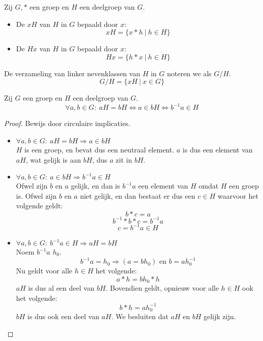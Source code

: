\documentclass[main.tex]{subfiles}
\begin{document}
\begin{de}
  \label{de:nevenklassen}
  Zij $G,*$ een groep en $H$ een deelgroep van $G$.
  \begin{itemize}
  \item De  $xH$ van $H$ in $G$ bepaald door $x$:
    \[ xH = \{ x * h\ |\ h \in H \} \]
  \item De  $Hx$ van $H$ in $G$ bepaald door $x$:
    \[ Hx = \{ h * x\ |\ h \in H \} \]
  \end{itemize}
  De verzameling van linker nevenklassen van $H$ in $G$ noteren we als $G/H$.
  \[ G/H = \{ xH\ |\ x \in G \} \]
\end{de}

\begin{ei}
  \label{ei:linker-nevenklasse-eig}
  Zij $G$ een groep en $H$ een deelgroep van $G$.
  \[ \forall a,b \in G:\ aH = bH \Leftrightarrow a \in bH \Leftrightarrow b^{-1}a \in H \]

  \begin{proof}
    Bewijs door circulaire implicaties.
    \begin{itemize}
    \item $\forall a,b \in G:\ aH = bH \Rightarrow a \in bH$\\
      $H$ is een groep, en bevat dus een neutraal element.
      $a$ is dus een element van $aH$, wat gelijk is aan $bH$, dus $a$ zit in $bH$.
    \item $\forall a,b \in G:\ a \in bH \Rightarrow b^{-1}a \in H$\\
      Ofwel zijn $b$ en $a$ gelijk, en dan is $b^{-1}a$ een element van $H$ omdat $H$ een groep is.
      Ofwel zijn $b$ en $a$ niet gelijk, en dan bestaat er dus een $c \in H$ waarvoor het volgende geldt:
      \[ b*c = a\]
      \[ b^{-1}*b*c = b^{-1}a\]
      \[ c = b^{-1}a \in H \]
    \item $\forall a,b \in G:\ b^{-1}a \in H\Rightarrow aH = bH$\\
      Noem $b^{-1}a$ $h_{0}$.
      \[ b^{-1}a = h_{0} \Rightarrow (a = bh_{0}) \text { en } b = a h_{0}^{-1} \]
      Nu geldt voor alle $h \in H$ het volgende:
      \[ a * h = bh_{0}*h \]
      $aH$ is dus al een deel van $bH$.
      Bovendien geldt, opnieuw voor alle $h \in H$ ook het volgende:
      \[ b * h = ah_{0}^{-1} \]
      $bH$ is dus ook een deel van $aH$.
      We besluiten dat $aH$ en $bH$ gelijk zijn.
   \end{itemize}
  \end{proof}
\end{ei}
\end{document}
